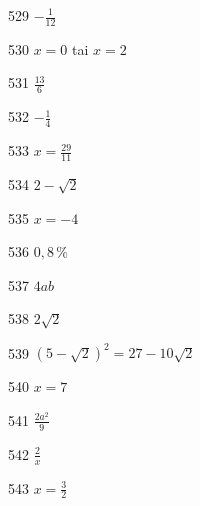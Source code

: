 \begin{Vastaus}{529}
		$-\frac{1}{12}$
	
\end{Vastaus}
\begin{Vastaus}{530}
				$x=0$ tai $x=2$
	
\end{Vastaus}
\begin{Vastaus}{531}
				$\frac{13}{6}$
	
\end{Vastaus}
\begin{Vastaus}{532}
				$-\frac{1}{4}$
	
\end{Vastaus}
\begin{Vastaus}{533}
				$x=\frac{29}{11}$
	
\end{Vastaus}
\begin{Vastaus}{534}
				$2-\sqrt{2}$
	
\end{Vastaus}
\begin{Vastaus}{535}
				$x=-4$
	
\end{Vastaus}
\begin{Vastaus}{536}
	$0,8\,\%$
	
\end{Vastaus}
\begin{Vastaus}{537}
				$4ab$
	
\end{Vastaus}
\begin{Vastaus}{538}
				$2\sqrt{2}$
	
\end{Vastaus}
\begin{Vastaus}{539}
				$(5-\sqrt{2})^2=27-10\sqrt{2}$ %
	
\end{Vastaus}
\begin{Vastaus}{540}
				$x=7$
	
\end{Vastaus}
\begin{Vastaus}{541}
				$\frac{2a^2}{9}$
	
\end{Vastaus}
\begin{Vastaus}{542}
				$\frac{2}{x}$
	
\end{Vastaus}
\begin{Vastaus}{543}
				$x=\frac{3}{2}$
	
\end{Vastaus}
